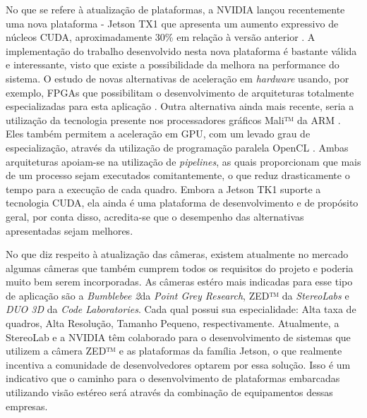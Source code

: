 No que se refere à atualização de plataformas, a NVIDIA lançou recentemente uma nova plataforma - Jetson TX1 que apresenta um aumento expressivo de núcleos CUDA, aproximadamente 30\% em relação à versão anterior \cite{JetsonTX1}. A implementação do trabalho desenvolvido nesta nova plataforma é bastante válida e interessante, visto que existe a possibilidade da melhora na performance do sistema. O estudo de novas alternativas de aceleração em \textit{hardware} usando, por exemplo, FPGAs que possibilitam o desenvolvimento de arquiteturas totalmente especializadas para esta aplicação \cite{Barry2015}. Outra alternativa ainda mais recente, seria a utilização da tecnologia presente nos processadores gráficos Mali™ da ARM \textregistered. Eles também permitem a aceleração em GPU, com um levado grau de especialização, através da utilização de programação paralela OpenCL \cite{StereoARM}. Ambas arquiteturas apoiam-se na utilização de \textit{pipelines}, as quais proporcionam que mais de um processo sejam executados comitantemente, o que reduz drasticamente o tempo para a execução de cada quadro. Embora a Jetson TK1 suporte a tecnologia CUDA, ela ainda é uma plataforma de desenvolvimento e de propósito geral, por conta disso, acredita-se que o desempenho das alternativas apresentadas sejam melhores.

No que diz respeito à atualização das câmeras, existem atualmente no mercado algumas câmeras que também cumprem todos os requisitos do projeto e poderia muito bem serem incorporadas. As câmeras estéro mais indicadas para esse tipo de aplicação são a \textit{Bumblebee 2}\textregistered da \textit{Point Grey Research}, ZED™ da \textit{StereoLabs} e \textit{DUO 3D} da \textit{Code Laboratories}. Cada qual possui sua especialidade: Alta taxa de quadros, Alta Resolução, Tamanho Pequeno, respectivamente. Atualmente, a StereoLab e a NVIDIA têm colaborado para o desenvolvimento de sistemas que utilizem a câmera ZED™ e as plataformas da família Jetson, o que realmente incentiva a comunidade de desenvolvedores optarem por essa solução. Isso é um indicativo que o caminho para o desenvolvimento de plataformas embarcadas utilizando visão estéreo será através da combinação de equipamentos dessas empresas.



